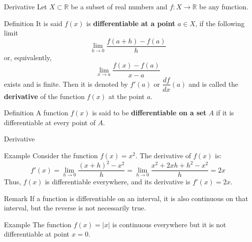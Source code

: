 \documentclass{beamer}
\newcommand{\R}{\mathbb{R}}
\begin{document}
\begin{frame}{Derivative}
Let $X \subset \R$ be a subset of real numbers and $f:X\to\R$ be any function.
    \begin{block}{Definition}
        It is said $f(x)$ is \textbf{differentiable at a point} $a\in X$, if the following limit
        \[
  \lim_{{h \to 0}} \frac{f(a + h) - f(a)}{h}
        \]
        or, equivalently,
        \[
  \lim_{{x\to a}} \frac{f(x) - f(a)}{x-a}
        \]
         exists and is finite. Then it is denoted by $f'(a)$ or $\dfrac{df}{dx}(a)$ and is called the \textbf{derivative} of the function $f(x)$ at the point $a$.
    \end{block}
\pause
    \begin{block}{Definition}
        A function $f(x)$ is said to be \textbf{differentiable on a set} $A$ if it is differentiable at every point of $A$.
    \end{block}
\end{frame}


\begin{frame}{Derivative}
    \begin{exampleblock}{Example}
        Consider the function $f(x) = x^2$. The derivative of $f(x)$ is:
        \[
        f'(x) = \lim\limits_{{h \to 0}} \frac{(x + h)^2 - x^2}{h} = \lim\limits_{{h \to 0}} \frac{x^2+2xh+h^2 - x^2}{h} = 2x
        \]
        Thus, $f(x)$ is differentiable everywhere, and its derivative is $f'(x) = 2x$.
    \end{exampleblock}
\pause
    \begin{block}{Remark}
        If a function is differentiable on an interval, it is also continuous on that interval, but the reverse is not necessarily true.
    \end{block}
        \begin{exampleblock}{Example}
        The function $f(x)=|x|$ is continuous everywhere but it is not differentiable at point $x=0$.
    \end{exampleblock}
\end{frame}
\end{document}

